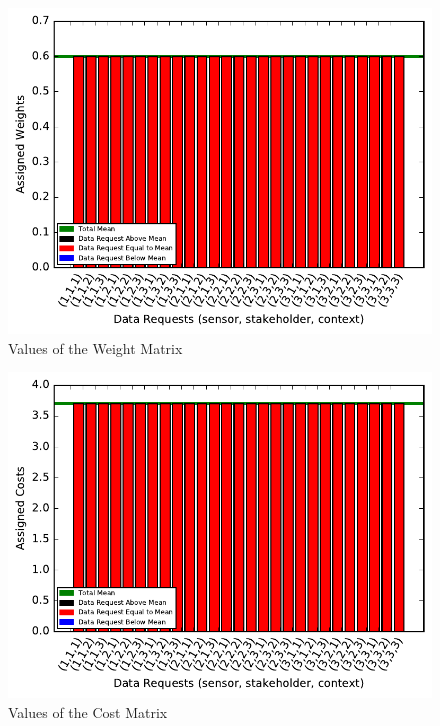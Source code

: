 \begin{figure}[ht!]
\centering
\includegraphics[width=\textwidth,keepaspectratio]{./images/weight_1_1}
\caption{Values of the Weight Matrix\label{weight11}}
\end{figure}
\begin{figure}[ht!]
\centering
\includegraphics[width=\textwidth,keepaspectratio]{./images/cost_1_1}
\caption{Values of the Cost Matrix \label{cost11}}
\end{figure}
   






